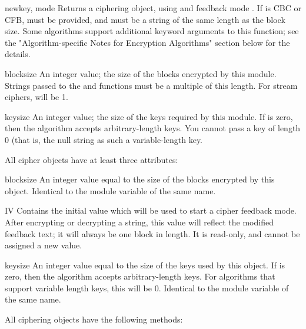 \documentclass{howto}
\begin{document}
\begin{funcdesc}{new}{key, mode}
Returns a ciphering object, using  and feedback mode
.  If  is CBC or CFB,  must be provided,
and must be a string of the same length as the block size.  Some
algorithms support additional keyword arguments to this function; see
the "Algorithm-specific Notes for Encryption Algorithms" section below for the details.
\end{funcdesc}

\begin{datadesc}{blocksize}
An integer value; the size of the blocks encrypted by this module.
Strings passed to the  and  functions
must be a multiple of this length.  For stream ciphers,
 will be 1. 
\end{datadesc}

\begin{datadesc}{keysize}
An integer value; the size of the keys required by this module.  If
 is zero, then the algorithm accepts arbitrary-length
keys.  You cannot pass a key of length 0 (that is, the null string
 as such a variable-length key.  
\end{datadesc}

All cipher objects have at least three attributes:

\begin{datadesc}{blocksize}
An integer value equal to the size of the blocks encrypted by this object.
Identical to the module variable of the same name.
\end{datadesc}

\begin{datadesc}{IV}
Contains the initial value which will be used to start a cipher
feedback mode.  After encrypting or decrypting a string, this value
will reflect the modified feedback text; it will always be one block
in length.  It is read-only, and cannot be assigned a new value.
\end{datadesc}

\begin{datadesc}{keysize}
An integer value equal to the size of the keys used by this object.  If
 is zero, then the algorithm accepts arbitrary-length
keys.  For algorithms that support variable length keys, this will be 0.
Identical to the module variable of the same name.  
\end{datadesc}

All ciphering objects have the following methods:
\end{document}
